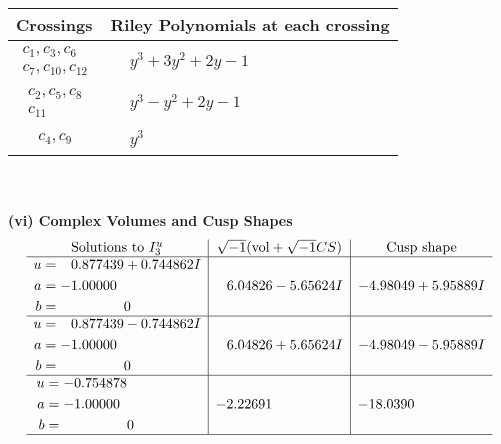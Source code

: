 \documentclass[1p]{elsarticle_modified}
\theoremstyle{definition}
\newcommand{\I}{\sqrt{-1}}
\begin{document}
\begin{tabular}{m{50pt}|m{274pt}}
Crossings & \hspace{64pt}Riley Polynomials at each crossing \\
\hline $$\begin{aligned}c_{1},c_{3},c_{6}\\c_{7},c_{10},c_{12}\end{aligned}$$&$\begin{aligned}
&y^3+3 y^2+2 y-1
\end{aligned}$\\
\hline $$\begin{aligned}c_{2},c_{5},c_{8}\\c_{11}\end{aligned}$$&$\begin{aligned}
&y^3- y^2+2 y-1
\end{aligned}$\\
\hline $$\begin{aligned}c_{4},c_{9}\end{aligned}$$&$\begin{aligned}
&y^3
\end{aligned}$\\
\hline
\end{tabular}\\~\\
\newpage\flushleft \textbf{(vi) Complex Volumes and Cusp Shapes}
$$\begin{array}{c|c|c}  
\text{Solutions to }I^u_{3}& \I (\text{vol} + \sqrt{-1}CS) & \text{Cusp shape}\\
 \hline 
\begin{aligned}
u &= \phantom{-}0.877439 + 0.744862 I \\
a &= -1.00000\phantom{ +0.000000I} \\
b &= \phantom{-0.000000 } 0\end{aligned}
 & \phantom{-}6.04826 - 5.65624 I & -4.98049 + 5.95889 I \\ \hline\begin{aligned}
u &= \phantom{-}0.877439 - 0.744862 I \\
a &= -1.00000\phantom{ +0.000000I} \\
b &= \phantom{-0.000000 } 0\end{aligned}
 & \phantom{-}6.04826 + 5.65624 I & -4.98049 - 5.95889 I \\ \hline\begin{aligned}
u &= -0.754878\phantom{ +0.000000I} \\
a &= -1.00000\phantom{ +0.000000I} \\
b &= \phantom{-0.000000 } 0\end{aligned}
 & -2.22691\phantom{ +0.000000I} & -18.0390\phantom{ +0.000000I}\\
 \hline 
 \end{array}$$\newpage\newpage\renewcommand{\arraystretch}{1}
\end{document}
